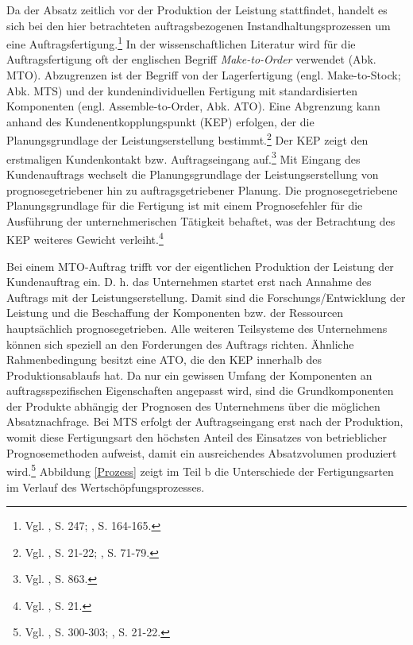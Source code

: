 Da der Absatz zeitlich vor der Produktion der Leistung stattfindet, handelt es sich bei den hier betrachteten auftragsbezogenen Instandhaltungsprozessen um eine Auftragsfertigung.\footnote{Vgl. \cite{hax1956industriebetrieb}, S. 247; \cite{Gutenberg1965dispos}, S. 164-165.} In der wissenschaftlichen Literatur wird für die Auftragsfertigung oft der englischen Begriff \textit{Make-to-Order} verwendet (Abk. MTO). Abzugrenzen ist der Begriff von der Lagerfertigung (engl. Make-to-Stock; Abk. MTS) und der kundenindividuellen Fertigung mit standardisierten Komponenten (engl. Assemble-to-Order, Abk. ATO). 
Eine Abgrenzung kann anhand des Kundenentkopplungspunkt (KEP) erfolgen, der die Planungsgrundlage der Leistungserstellung bestimmt.\footnote{Vgl. \cite{quante2009management}, S. 21-22; \cite{sharman1984rediscovery}, S. 71-79.} Der KEP zeigt den erstmaligen Kundenkontakt bzw. Auftragseingang auf.\footnote{Vgl. \cite{Olhager2010863}, S. 863.} Mit Eingang des Kundenauftrags wechselt die Planungsgrundlage der Leistungserstellung von prognosegetriebener hin zu auftragsgetriebener Planung. Die prognosegetriebene Planungsgrundlage für die Fertigung ist mit einem Prognosefehler für die Ausführung der unternehmerischen Tätigkeit behaftet, was der Betrachtung des KEP weiteres Gewicht verleiht.\footnote{Vgl. \cite{quante2009management}, S. 21.} %

Bei einem MTO-Auftrag trifft vor der eigentlichen Produktion der Leistung der Kundenauftrag ein. D. h. das Unternehmen startet erst nach Annahme des Auftrags mit der Leistungserstellung. Damit sind die Forschungs/Entwicklung der Leistung und die Beschaffung der Komponenten bzw. der Ressourcen hauptsächlich prognosegetrieben. Alle weiteren Teilsysteme des Unternehmens können sich speziell an den Forderungen des Auftrags richten. Ähnliche Rahmenbedingung besitzt eine ATO, die den KEP innerhalb des Produktionsablaufs hat. Da nur ein gewissen Umfang der Komponenten an auftragsspezifischen Eigenschaften angepasst wird, sind die Grundkomponenten der Produkte abhängig der Prognosen des Unternehmens über die möglichen Absatznachfrage. Bei MTS erfolgt der Auftragseingang erst nach der Produktion, womit diese Fertigungsart den höchsten Anteil des Einsatzes von betrieblicher Prognosemethoden aufweist, damit ein ausreichendes Absatzvolumen produziert wird.\footnote{Vgl. \cite{fleischmeyr2004codp}, S. 300-303; \cite{quante2009management}, S. 21-22.} Abbildung \ref{Prozess} zeigt im Teil b die Unterschiede der Fertigungsarten im Verlauf des Wertschöpfungsprozesses. 

